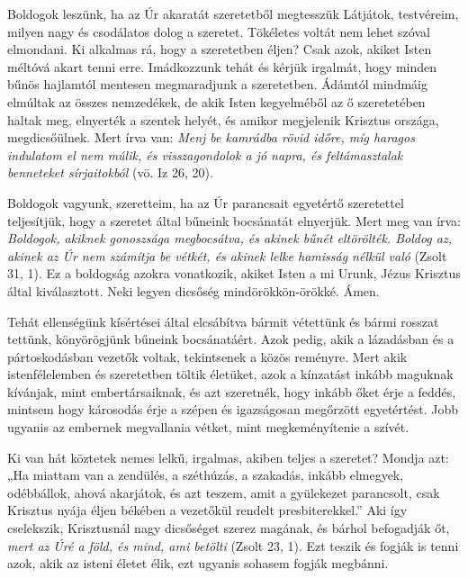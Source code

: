\documentclass[twoside]{article}
\begin{document}
\begin{lectio}{Boldogok leszünk, ha az Úr akaratát szeretetből megtesszük}
\noindent Látjátok, testvéreim, milyen nagy és csodálatos dolog a szeretet. Tökéletes voltát nem lehet szóval elmondani. Ki alkalmas rá, hogy a szeretetben éljen? Csak azok, akiket Isten méltóvá akart tenni erre. Imádkozzunk tehát és kérjük irgalmát, hogy minden bűnös hajlamtól mentesen megmaradjunk a szeretetben. Ádámtól mindmáig elmúltak az összes nemzedékek, de akik Isten kegyelméből az ő szeretetében haltak meg, elnyerték a szentek helyét, és amikor megjelenik Krisztus országa, megdicsőülnek. Mert írva van: \textit{Menj be kamrádba rövid időre, míg haragos indulatom el nem múlik, és visszagondolok a jó napra, és feltámasztalak benneteket sírjaitokból} (vö. Iz 26, 20).

Boldogok vagyunk, szeretteim, ha az Úr parancsait egyetértő szeretettel teljesítjük, hogy a szeretet által bűneink bocsánatát elnyerjük. Mert meg van írva: \textit{Boldogok, akiknek gonoszsága megbocsátva, és akinek bűnét eltörölték. Boldog az, akinek az Úr nem számítja be vétkét, és akinek lelke hamisság nélkül való} (Zsolt 31, 1). Ez a boldogság azokra vonatkozik, akiket Isten a mi Urunk, Jézus Krisztus által kiválasztott. Neki legyen dicsőség mindörökkön-örökké. Ámen.

Tehát ellenségünk kísértései által elcsábítva bármit vétettünk és bármi rosszat tettünk, könyörögjünk bűneink bocsánatáért. Azok pedig, akik a lázadásban és a pártoskodásban vezetők voltak, tekintsenek a közös reményre. Mert akik istenfélelemben és szeretetben töltik életüket, azok a kínzatást inkább maguknak kívánjak, mint embertársaiknak, és azt szeretnék, hogy inkább őket érje a feddés, mintsem hogy károsodás érje a szépen és igazságosan megőrzött egyetértést. Jobb ugyanis az embernek megvallania vétket, mint megkeményítenie a szívét.

Ki van hát köztetek nemes lelkű, irgalmas, akiben teljes a szeretet? Mondja azt: „Ha miattam van a zendülés, a széthúzás, a szakadás, inkább elmegyek, odébbállok, ahová akarjátok, és azt teszem, amit a gyülekezet parancsolt, csak Krisztus nyája éljen békében a vezetőkül rendelt presbiterekkel.” Aki így cselekszik, Krisztusnál nagy dicsőséget szerez magának, és bárhol befogadják őt, \textit{mert az Úré a föld, és mind, ami betölti} (Zsolt 23, 1). Ezt teszik és fogják is tenni azok, akik az isteni életet élik, ezt ugyanis sohasem fogják megbánni.
\end{lectio}

\end{document}
